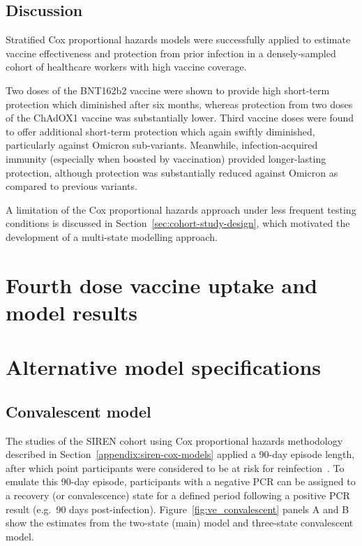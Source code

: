 \subsection{Discussion}

Stratified Cox proportional hazards models were successfully applied to estimate vaccine effectiveness and protection from prior infection in a densely-sampled cohort of healthcare workers with high vaccine coverage.

Two doses of the BNT162b2 vaccine were shown to provide high short-term protection which diminished after six months, whereas protection from two doses of the ChAdOX1 vaccine was substantially lower. Third vaccine doses were found to offer additional short-term protection which again swiftly diminished, particularly against Omicron sub-variants. Meanwhile, infection-acquired immunity (especially when boosted by vaccination) provided longer-lasting protection, although protection was substantially reduced against Omicron as compared to previous variants.

A limitation of the Cox proportional hazards approach under less frequent testing conditions is discussed in Section~\ref{sec:cohort-study-design}, which motivated the development of a multi-state modelling approach.

\section{Fourth dose vaccine uptake and model results}

\begingroup\small

\endgroup





\clearpage

\section{Alternative model specifications}\label{appendix:alt-models}

\subsection{Convalescent model}

The studies of the SIREN cohort using Cox proportional hazards methodology described in Section~\ref{appendix:siren-cox-models} applied a 90-day episode length, after which point participants were considered to be at risk for reinfection~\parencite{Hall2022-ep, Hall2024-ai}. To emulate this 90-day episode, participants with a negative PCR can be assigned to a recovery (or convalescence) state for a defined period following a positive PCR result (e.g.\ 90 days post-infection). Figure~\ref{fig:ve_convalescent} panels A and B show the estimates from the two-state (main) model and three-state convalescent model.

